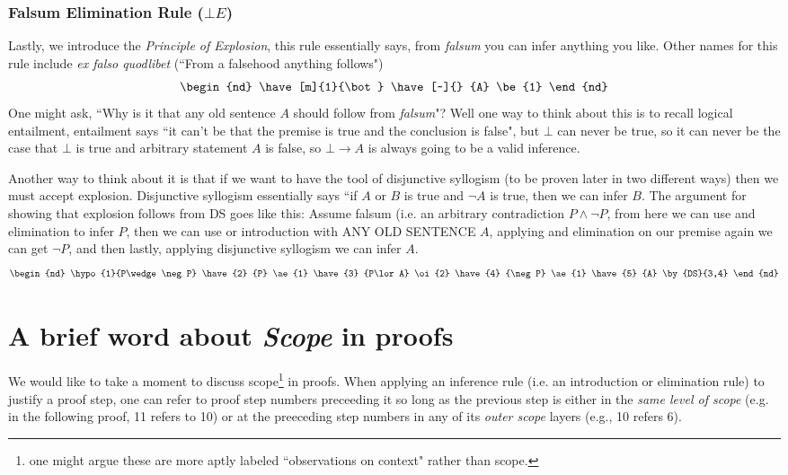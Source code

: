 \subsubsection{Falsum Elimination Rule ($\bot E$)}
Lastly, we introduce the \textit{Principle of Explosion}, this rule essentially says, from \textit{falsum} you can infer anything you like. Other names for this rule include \textit{ex falso quodlibet} (``From a falsehood anything follows")
\begin{equation}
    \begin{nd}
        \have[m]{1}{\bot}
        \have[~]{} {A} \be{1}
    \end{nd} \nonumber
\end{equation}
One might ask, ``Why is it that any old sentence $A$ should follow from \textit{falsum}"? Well one way to think about this is to recall logical entailment, entailment says ``it can't be that the premise is true and the conclusion is false", but $\bot$ can never be true, so it can never be the case that $\bot$ is true and arbitrary statement $A$ is false, so $\bot \rightarrow A$ is always going to be a valid inference.

Another way to think about it is that if we want to have the tool of disjunctive syllogism (to be proven later in two different ways) then we must accept explosion. Disjunctive syllogism essentially says ``if $A$ or $B$ is true and $\neg A$ is true, then we can infer $B$. The argument for showing that explosion follows from DS goes like this: Assume falsum (i.e. an arbitrary contradiction $P \wedge \neg P$, from here we can use and elimination to infer $P$, then we can use or introduction with ANY OLD SENTENCE $A$, applying and elimination on our premise again we can get $\neg P$, and then lastly, applying disjunctive syllogism we can infer $A$.
\begin{equation}
    \begin{nd}
        \hypo{1}{P\wedge \neg P}
        \have{2} {P} \ae{1}
        \have{3} {P\lor A} \oi{2}
        \have{4} {\neg P} \ae{1}
        \have{5} {A} \by{DS}{3,4}
    \end{nd} \nonumber
\end{equation}
\newpage
\section{A brief word about \textit{Scope} in proofs}
We would like to take a moment to discuss scope\footnote{one might argue these are more aptly labeled ``observations on context" rather than scope.} in proofs. When applying an inference rule (i.e. an introduction or elimination rule) to justify a proof step, one can refer to proof step numbers preceeding it so long as the previous step is either in the \textit{same level of scope} (e.g. in the following proof, 11 refers to 10) or at the preeceding step numbers in any of its \textit{outer scope} layers (e.g., 10 refers 6). 

